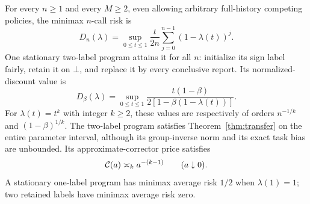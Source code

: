 \begin{theorem}\label{thm:diagnostic}
For every $n\ge1$ and every $M\ge2$, even allowing arbitrary full-history competing policies, the minimax $n$-call risk is
\begin{equation}\label{eq:diagnostic-value}
 D_n(\lambda)=\sup_{0\le t\le1}\frac{t}{2n}
                   \sum_{j=0}^{n-1}(1-\lambda(t))^j.
\end{equation}
One stationary two-label program attains it for all $n$: initialize its sign label fairly, retain it on $\bot$, and replace it by every conclusive report. Its normalized-discount value is
\begin{equation}\label{eq:diagnostic-discount}
 D_\beta(\lambda)=\sup_{0\le t\le1}
 \frac{t(1-\beta)}{2[1-\beta(1-\lambda(t))]}.
\end{equation}
For $\lambda(t)=t^k$ with integer $k\ge2$, these values are respectively of orders $n^{-1/k}$ and $(1-\beta)^{1/k}$. The two-label program satisfies Theorem~\ref{thm:transfer} on the entire parameter interval, although its group-inverse norm and its exact task bias are unbounded. Its approximate-corrector price satisfies
\begin{equation}\label{eq:sharp-price}
 \mathcal C(a)\asymp_k a^{-(k-1)}\qquad(a\downarrow0).
\end{equation}
A stationary one-label program has minimax average risk $1/2$ when $\lambda(1)=1$; two retained labels have minimax average risk zero.
\end{theorem}
